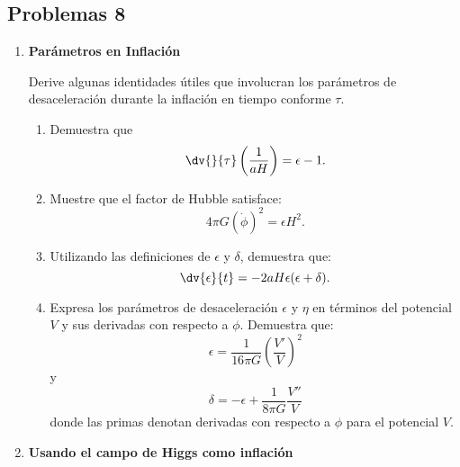 \documentclass[../main]{subfiles}
\begin{document}
\begin{adjustwidth}{0pt}{-100pt}
\section*{Problemas 8}
\begin{enumerate}
    \item \textbf{Parámetros en Inflación}
    
    Derive algunas identidades útiles que involucran los parámetros de desaceleración durante la inflación en tiempo conforme $\tau$.
    \begin{enumerate}[label=(\alph*)]
        \item Demuestra que 
        \begin{equation}
            \dv{}{\tau}\left(\dfrac{1}{aH}\right)=\epsilon-1.
        \end{equation}
        \item Muestre que el factor de Hubble satisface:
        \begin{equation}
            4\pi G(\dot{\phi})^2=\epsilon H^2.
        \end{equation}
        \item Utilizando las definiciones de $\epsilon$ y $\delta$, demuestra que:
        \begin{equation}
            \dv{\epsilon}{t}=-2aH\epsilon(\epsilon+\delta).
        \end{equation}
        \item Expresa los parámetros de desaceleración $\epsilon$ y $\eta$ en términos del potencial $V$ y sus derivadas con respecto a $\phi$. Demuestra que:
        \begin{equation}
            \epsilon=\dfrac{1}{16\pi G}\left(\dfrac{V'}{V}\right)^2
        \end{equation}
        y
        \begin{equation}
            \delta=-\epsilon+\dfrac{1}{8\pi G}\dfrac{V''}{V}
        \end{equation}
        donde las primas denotan derivadas con respecto a $\phi$ para el potencial $V$.
    \end{enumerate}
    \item \textbf{Usando el campo de Higgs como inflación}
    

\end{enumerate}
\end{adjustwidth}
\end{document}
